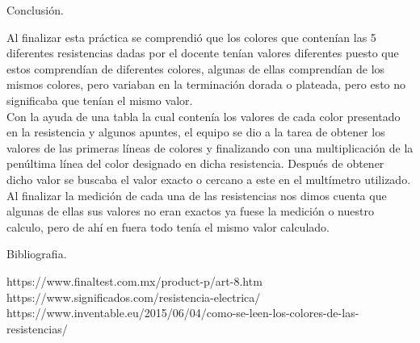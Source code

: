 \documentclass[11pt,a4paper]{report}
\begin{document}
\begin{flushleft}
	
	
\end{flushleft}



\newpage

	\begin{center}
	\begin{Large}
		Conclusi\'on.\\
		\vspace{1.5cm}
	\end{Large}
\end{center}
\begin{flushleft}
	Al finalizar esta práctica se comprendió que los colores que contenían las 5 diferentes resistencias dadas por el docente tenían valores diferentes puesto que estos comprendían de diferentes colores, algunas de ellas comprendían de los mismos colores, pero variaban en la terminación dorada o plateada, pero esto no significaba que tenían el mismo valor.\\
	\vspace*{0.5cm}
	Con la ayuda de una tabla la cual contenía los valores de cada color presentado en la resistencia y algunos apuntes, el equipo se dio a la tarea de obtener los valores de las primeras líneas de colores y finalizando con una multiplicación de la penúltima línea del color designado en dicha resistencia. Después de obtener dicho valor se buscaba el valor exacto o cercano a este en el multímetro utilizado.\\
	\vspace*{0.5cm}
	Al finalizar la medición de cada una de las resistencias nos dimos cuenta que algunas de ellas sus valores no eran exactos ya fuese la medición o nuestro calculo, pero de ahí en fuera todo tenía el mismo valor calculado.
\end{flushleft}


\newpage

	\begin{center}
	\begin{huge}
		Bibliografia.\\
		\vspace*{1.5cm}
	\end{huge}
	\begin{flushleft}
		https://www.finaltest.com.mx/product-p/art-8.htm\\
		https://www.significados.com/resistencia-electrica/\\
		https://www.inventable.eu/2015/06/04/como-se-leen-los-colores-de-las-resistencias/\\
	\end{flushleft}
\end{center}
	
\end{document}
